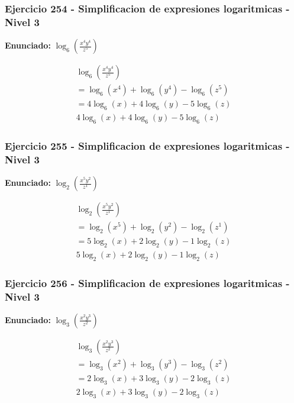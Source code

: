 \documentclass[12pt,a4paper]{article}
\begin{document}
\subsubsection*{Ejercicio 254 - Simplificacion de expresiones logaritmicas - Nivel 3}
\textbf{Enunciado:} \(\log_{6}\left(\frac{x^{4}y^{4}}{z^{5}}\right)\)

\[
\begin{aligned}
\log_{6}\left(\frac{x^{4}y^{4}}{z^{5}}\right)\\
=\log_{6}\left(x^{4}\right)+\log_{6}\left(y^{4}\right)-\log_{6}\left(z^{5}\right)\\
=4\log_{6}\left(x\right)+4\log_{6}\left(y\right)-5\log_{6}\left(z\right)\\
\boxed{4\log_{6}\left(x\right)+4\log_{6}\left(y\right)-5\log_{6}\left(z\right)}
\end{aligned}
\]


\subsubsection*{Ejercicio 255 - Simplificacion de expresiones logaritmicas - Nivel 3}
\textbf{Enunciado:} \(\log_{2}\left(\frac{x^{5}y^{2}}{z^{1}}\right)\)

\[
\begin{aligned}
\log_{2}\left(\frac{x^{5}y^{2}}{z^{1}}\right)\\
=\log_{2}\left(x^{5}\right)+\log_{2}\left(y^{2}\right)-\log_{2}\left(z^{1}\right)\\
=5\log_{2}\left(x\right)+2\log_{2}\left(y\right)-1\log_{2}\left(z\right)\\
\boxed{5\log_{2}\left(x\right)+2\log_{2}\left(y\right)-1\log_{2}\left(z\right)}
\end{aligned}
\]


\subsubsection*{Ejercicio 256 - Simplificacion de expresiones logaritmicas - Nivel 3}
\textbf{Enunciado:} \(\log_{3}\left(\frac{x^{2}y^{3}}{z^{2}}\right)\)

\[
\begin{aligned}
\log_{3}\left(\frac{x^{2}y^{3}}{z^{2}}\right)\\
=\log_{3}\left(x^{2}\right)+\log_{3}\left(y^{3}\right)-\log_{3}\left(z^{2}\right)\\
=2\log_{3}\left(x\right)+3\log_{3}\left(y\right)-2\log_{3}\left(z\right)\\
\boxed{2\log_{3}\left(x\right)+3\log_{3}\left(y\right)-2\log_{3}\left(z\right)}
\end{aligned}
\]
\end{document}
